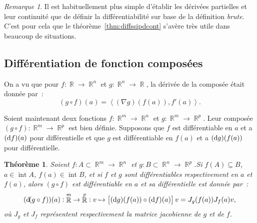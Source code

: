\documentclass{article}
\DeclareMathOperator{\intr}{int}
\DeclareMathOperator{\R}{\mathbb R}
\newcommand{\scpr}[2]{{\left\langle#1, #2\right\rangle}}
\newtheorem{thm}{Théorème}[section]
\theoremstyle{definition}
\theoremstyle{remark}
\newtheorem*{rmq}{Remarque}
\begin{document}
		\begin{rmq} Il est habituellement plus simple d'établir les dérivées partielles et leur continuité que de définir la différentiabilité sur base de la
		définition \emph{brute}. C'est pour cela que le théorème~\ref{thm:diffssipdcont} s'avère très utile dans beaucoup de situations.
		\end{rmq}

	\subsection{Différentiation de fonction composées}
		On a vu que pour $f : \R \to \R^n$ et $g : \R^n \to \R$, la dérivée de la composée était donnée par~:
		\[(g \circ f)(a) = \scpr {(\nabla g)(f(a))}{f'(a)}.\]

		Soient maintenant deux fonctions $f : \R^m \to \R^n$ et $g : \R^m \to \R^p$. Leur composée $(g \circ f) : \R^m \to \R^p$ est bien définie. Supposons
		que $f$ est différentiable en $a$ et a $(\dif f)(a)$ pour différentielle et que $g$ est différentiable en $f(a)$ et a $(\dif g)(f(a))$ pour
		différentielle.

		\begin{thm} Soient $f : A \subset \R^m \to \R^n$ et $g : B \subset \R^n \to \R^p$.Si $f(A) \subseteq B$, $a \in \intr A$, $f(a) \in \intr B$, et si
		$f$ et $g$ sont différentiables respectivement en $a$ et $f(a)$, alors $(g \circ f)$ est différentiable en $a$ et sa différentielle est donnée par~:
		\[(\dif (g \circ f))(a) : \R^m \to \R^p : v \mapsto \left[(\dif g)(f(a)) \circ (\dif f)(a)\right]v = J_g(f(a))J_f(a)v,\]
		où $J_g$ et $J_f$ représentent respectivement la matrice jacobienne de $g$ et de $f$.
		\end{thm}
\end{document}
